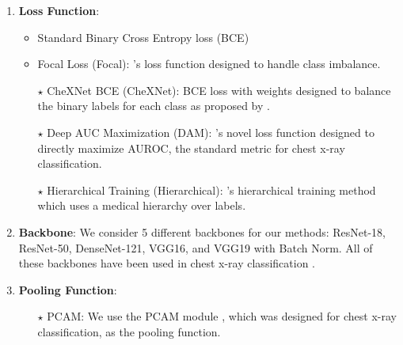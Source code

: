 \begin{enumerate}
    \item \textbf{Loss Function}:
        \begin{itemize}
            \item Standard Binary Cross Entropy loss (BCE) 
            \item Focal Loss (Focal): \citet{lin2017focal}'s loss function designed to handle class imbalance.
            \item[$\star$] CheXNet BCE (CheXNet): BCE loss with weights designed to balance the binary labels for each class as proposed by \citet{rajpurkar2017chexnet}.
            \item[$\star$]Deep AUC Maximization (DAM): \citet{yuan2020large}'s novel loss function designed to directly maximize AUROC, the standard metric for chest x-ray classification.
            \item[$\star$]  Hierarchical Training (Hierarchical): \citet{pham2021interpreting}'s hierarchical training method which uses a medical hierarchy over labels.
        \end{itemize}
    \item \textbf{Backbone}: We consider 5 different backbones for our methods: ResNet-18, ResNet-50, DenseNet-121, VGG16, and VGG19 with Batch Norm. All of these backbones have been used in chest x-ray classification \citep{moses2021deep}.
    \item \textbf{Pooling Function}: 
        \begin{itemize}
            \item[$\star$] PCAM: We use the PCAM module \citep{ye2020weakly}, which was designed for chest x-ray classification, as the pooling function.

\end{itemize}
\end{enumerate}
